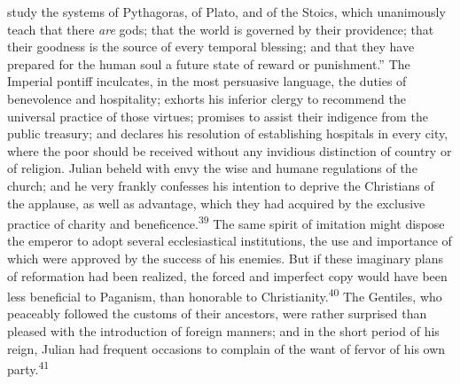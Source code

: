 study the systems of Pythagoras, of Plato, and of the Stoics,
which unanimously teach that there \textit{are} gods; that the world is
governed by their providence; that their goodness is the source
of every temporal blessing; and that they have prepared for the
human soul a future state of reward or punishment.” The Imperial
pontiff inculcates, in the most persuasive language, the duties
of benevolence and hospitality; exhorts his inferior clergy to
recommend the universal practice of those virtues; promises to
assist their indigence from the public treasury; and declares his
resolution of establishing hospitals in every city, where the
poor should be received without any invidious distinction of
country or of religion. Julian beheld with envy the wise and
humane regulations of the church; and he very frankly confesses
his intention to deprive the Christians of the applause, as well
as advantage, which they had acquired by the exclusive practice
of charity and beneficence.\textsuperscript{39} The same spirit of imitation might
dispose the emperor to adopt several ecclesiastical institutions,
the use and importance of which were approved by the success of
his enemies. But if these imaginary plans of reformation had been
realized, the forced and imperfect copy would have been less
beneficial to Paganism, than honorable to Christianity.\textsuperscript{40} The
Gentiles, who peaceably followed the customs of their ancestors,
were rather surprised than pleased with the introduction of
foreign manners; and in the short period of his reign, Julian had
frequent occasions to complain of the want of fervor of his own
party.\textsuperscript{41}




